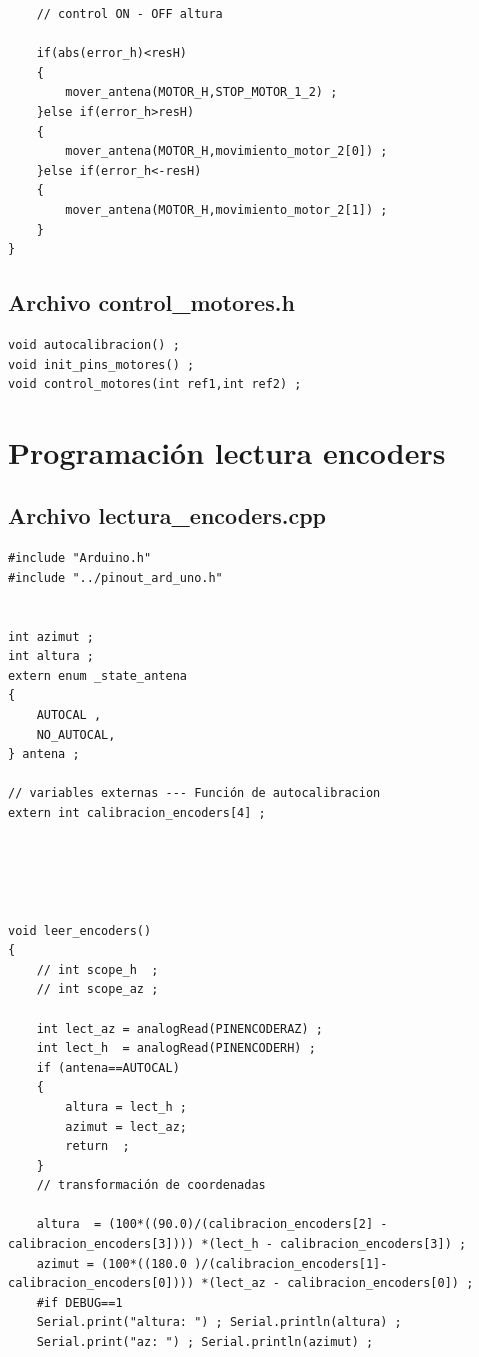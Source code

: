 \begin{appendices}
\begin{verbatim}
	// control ON - OFF altura
	
	if(abs(error_h)<resH)
	{
		mover_antena(MOTOR_H,STOP_MOTOR_1_2) ; 
	}else if(error_h>resH)
	{
		mover_antena(MOTOR_H,movimiento_motor_2[0]) ;     
	}else if(error_h<-resH)
	{ 
		mover_antena(MOTOR_H,movimiento_motor_2[1]) ; 
	} 
}

		\end{verbatim}

	\subsection{Archivo control\_motores.h} 
	

		\begin{verbatim}
void autocalibracion() ; 
void init_pins_motores() ; 
void control_motores(int ref1,int ref2) ; 
		\end{verbatim}

	
	
	\section{Programación lectura encoders} 
	\subsection{Archivo lectura\_encoders.cpp} 

		\begin{verbatim}
#include "Arduino.h" 
#include "../pinout_ard_uno.h"


int azimut ; 
int altura ;
extern enum _state_antena 
{
	AUTOCAL ,  
	NO_AUTOCAL, 
} antena ;

// variables externas --- Función de autocalibracion  
extern int calibracion_encoders[4] ; 





void leer_encoders()
{
	// int scope_h  ; 
	// int scope_az ; 
	
	int lect_az = analogRead(PINENCODERAZ) ; 
	int lect_h  = analogRead(PINENCODERH) ; 
	if (antena==AUTOCAL) 
	{
		altura = lect_h ; 
		azimut = lect_az; 
		return  ; 
	}
	// transformación de coordenadas 
	
	altura  = (100*((90.0)/(calibracion_encoders[2] - calibracion_encoders[3]))) *(lect_h - calibracion_encoders[3]) ; 
	azimut = (100*((180.0 )/(calibracion_encoders[1]- calibracion_encoders[0]))) *(lect_az - calibracion_encoders[0]) ; 
	#if DEBUG==1
	Serial.print("altura: ") ; Serial.println(altura) ; 
	Serial.print("az: ") ; Serial.println(azimut) ; 
	

\end{verbatim}
\end{appendices}
